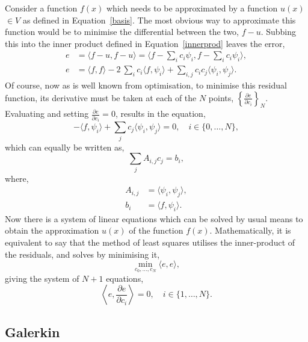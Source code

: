 Consider a function $f(x)$ which needs to be approximated by a function $u(x)$ $\in V$ as defined in Equation~\eqref{basis}. The most obvious way to approximate this function would be to minimise the differential between the two, $f-u$. Subbing this into the inner product defined in Equation~\eqref{innerprod} leaves the error,
\begin{align}
	e &= \langle f-u, f-u\rangle = \langle f-\sum_i c_i \psi_i,f-\sum_i c_i \psi_i\rangle,\\
	e &= \langle f,f\rangle - 2~\sum_i c_i\langle f,\psi_i\rangle + \sum_{i,j} c_i c_j \langle\psi_i, \psi_j\rangle. 
\end{align}
Of course, now as is well known from optimisation, to minimise this residual function, its derivative must be taken at each of the $N$ points, $\left\{\frac{\partial e}{\partial c_i}\right\}_N$. Evaluating and setting $\frac{\partial e}{\partial c_i} = 0$, results in the equation,
\begin{equation}
	- \langle f,\psi_i\rangle + \sum_j c_j\langle \psi_i, \psi_j\rangle = 0,\quad i \in \{0,\dots,N\},
\end{equation}
which can equally be written as,
\begin{equation}
	\sum_j A_{i,j}c_j = b_i,
\end{equation}
where,
\begin{align}
	A_{i,j} &= \langle \psi_i, \psi_j\rangle,\\
	b_i &= \langle f, \psi_i \rangle.
\end{align}
Now there is a system of linear equations which can be solved by usual means to obtain the approximation $u(x)$ of the function $f(x)$. Mathematically, it is equivalent to say that the method of least squares utilises the inner-product of the residuals, and solves by minimising it,
\begin{equation}
	\min_{c_0,\dots,c_N} \langle e, e\rangle,
\end{equation}
giving the system of $N+1$ equations,
\begin{equation}
	\left\langle e, \frac{\partial e}{\partial c_i}\right\rangle = 0, \quad i\in\{1,\dots,N\}.
\end{equation}
\cite{mardal}

\subsection{Galerkin}

